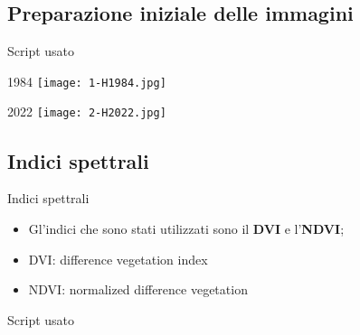 \documentclass{beamer}
\begin{document}
\subsection{Preparazione iniziale delle immagini}

\begin{frame}{Script usato}
    \begin{tiny}
        
    \end{tiny}
\end{frame}

\begin{frame}{1984}
    \texttt{[image: 1-H1984.jpg]}
    \centering
\end{frame}

\begin{frame}{2022}
    \texttt{[image: 2-H2022.jpg]}
    \centering
\end{frame}


\subsection{Indici spettrali}

\begin{frame}{Indici spettrali}
    \begin{itemize}
        \item Gl'indici che sono stati utilizzati sono il \textbf{DVI} e l'\textbf{NDVI};
        
        \bigskip
        
        \item \pause DVI:  difference vegetation index
        
        \bigskip
        
        \item \pause NDVI:  normalized difference vegetation 
    \end{itemize}
\end{frame}

\begin{frame}{Script usato}
    \begin{scriptsize}
    
    \end{scriptsize}
\end{frame}
\end{document}
